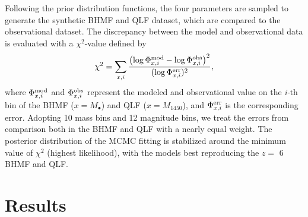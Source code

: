 \documentclass[twocolumn, twocolappendix]{aastex63}
\newcommand{\Mbh}{M_\bullet}
\newcommand{\Muv}{M_{1450}}
\newcommand{\red}[1]{\textcolor{red}{ #1}}
\begin{document}
\begin{CJK*}{UTF8}{gbsn}
Following the prior distribution functions, the four parameters are sampled to generate the synthetic 
BHMF and QLF dataset, which are compared to the observational dataset. 
The discrepancy between the model and observational data is evaluated with a $\chi^2$-value defined by
\begin{align}
  \chi^2 = \sum_{x,i}
  \frac{\left(\log{\Phi^{\rm mod}_{x,i}} - \log{\Phi^{\rm obs}_{x,i}}\right)^2}{(\log{\Phi^{\rm err}_{x,i}})^2},
\end{align}
where $\Phi^{\rm mod}_{x,i}$ and $\Phi^{\rm obs}_{x,i}$ represent the modeled and observational value 
on the \textit{i-}th bin of the BHMF ($x=\Mbh$) and QLF ($x=\Muv$), and $\Phi^{\rm err}_{x,i}$ is the corresponding error.
Adopting 10 mass bins and 12 magnitude bins, we treat the errors from comparison both in the BHMF and QLF
with a nearly equal weight.
The posterior distribution of the MCMC fitting is stabilized around the minimum value of $\chi^2$ (highest likelihood), 
with the models best reproducing the $z=$ 6 BHMF and QLF.



\vspace{2mm}
\section{Results}\label{sec:fitting_result}







\end{CJK*}
\end{document}
